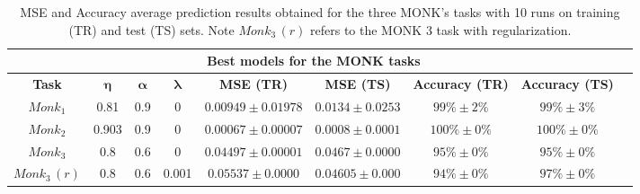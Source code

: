 \documentclass[11pt]{article}
\begin{document}
\begin{table}[H]
\small
    \centering
    \begin{tabular}{ |c|c|c|c|c|c|c|c|c|}
    \hline
     \multicolumn{8}{|c|}{\textbf{Best models for the MONK tasks}} \\
      \hline
       \textbf{Task} & $\boldsymbol{\eta}$ & $\boldsymbol{\alpha}$ & $\boldsymbol{\lambda}$& \textbf{MSE (TR)} & \textbf{MSE (TS)} & \textbf{Accuracy (TR)} & \textbf{Accuracy (TS)} \\
     \hline
    $Monk_1$ &  0.81  & 0.9  & 0 & $0.00949\pm0.01978$ & $0.0134\pm0.0253$& $99\%\pm2\%$& $99\%\pm3\%$\\
    \hline
    $Monk_2$ & 0.903 & 0.9  & 0 & $0.00067\pm0.00007$& $0.0008\pm0.0001$& $100\%\pm0\%$&$ 100\%\pm0\%$\\
    \hline
    $Monk_3$ & 0.8   & 0.6  & 0 &$ 0.04497\pm0.00001$& $0.0467\pm0.0000$& $95\%\pm0\%$& $95 \%\pm0\%$\\
    \hline
    $Monk_3 \,(r)$&  0.8   & 0.6 & 0.001& $0.05537\pm0.0000$& $0.04605\pm0.000$& $94\%\pm0\%$& $97\%\pm0\%$\\

     \hline
    \end{tabular}
    \caption{MSE and Accuracy average prediction results obtained for the three MONK’s tasks with 10 runs on training (TR) and test (TS) sets. Note $Monk_3 \,(r)$ refers to the MONK 3 task with regularization.}
    \label{tab:monk_results}
\end{table}
\end{document}
